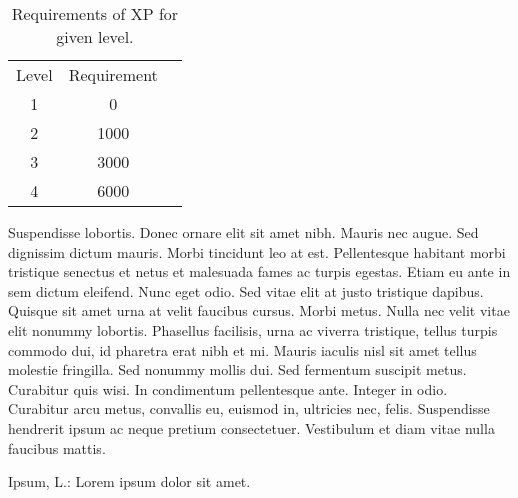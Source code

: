 \documentclass[thesismargins, thesislinespacing, twoside, draft, upjsfrontpage]{rnthesis}
\begin{document}
\begin{table}
\begin{center}
\begin{tabular}{ccc}
Level & Requirement\\
1 & 0\\
2 & 1000\\
3 & 3000\\
4 & 6000
\end{tabular}
\end{center}
\caption{Requirements of XP for given level.}
\end{table}
Suspendisse lobortis. Donec ornare elit sit amet nibh. Mauris nec
augue. Sed dignissim dictum mauris. Morbi tincidunt leo at est.
Pellentesque habitant morbi tristique senectus et netus et
malesuada fames ac turpis egestas. Etiam eu ante in sem dictum
eleifend. Nunc eget odio. Sed vitae elit at justo tristique
dapibus. Quisque sit amet urna at velit faucibus cursus.
Morbi metus. Nulla nec velit vitae elit
nonummy lobortis. Phasellus facilisis, urna ac viverra tristique,
tellus turpis commodo dui, id pharetra erat nibh et mi. Mauris
iaculis nisl sit amet tellus molestie fringilla. Sed nonummy mollis
dui. Sed fermentum suscipit metus. Curabitur quis wisi. In
condimentum pellentesque ante. Integer in odio. Curabitur arcu
metus, convallis eu, euismod in, ultricies nec, felis. Suspendisse
hendrerit ipsum ac neque pretium consectetuer. Vestibulum et diam
vitae nulla faucibus mattis. 


%

\begin{thebibliography}{9}
 Ipsum, L.: Lorem ipsum dolor sit amet.
\end{thebibliography}
%
\end{document}
